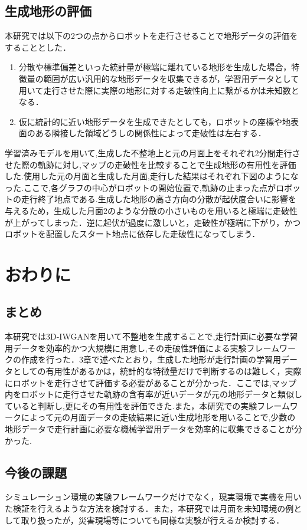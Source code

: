 \documentclass[twocolumn]{jarticle} %
\begin{document}
\subsection{生成地形の評価}
本研究では以下の2つの点からロボットを走行させることで地形データの評価をすることとした．
\begin{enumerate}
  \item 分散や標準偏差といった統計量が極端に離れている地形を生成した場合，特徴量の範囲が広い汎用的な地形データを収集できるが，学習用データとして用いて走行させた際に実際の地形に対する走破性向上に繋がるかは未知数となる．
  \item 仮に統計的に近い地形データを生成できたとしても，ロボットの座標や地表面のある隣接した領域どうしの関係性によって走破性は左右する．
\end{enumerate}
学習済みモデルを用いて,生成した不整地上と元の月面上をそれぞれ2分間走行させた際の軌跡に対し,マップの走破性を比較することで生成地形の有用性を評価した.使用した元の月面と生成した月面,走行した結果はそれぞれ下図のようになった.ここで,各グラフの中心がロボットの開始位置で,軌跡の止まった点がロボットの走行終了地点である.生成した地形の高さ方向の分散が起伏度合いに影響を与えるため，生成した月面2のような分散の小さいものを用いると極端に走破性が上がってしまった．逆に起伏が過度に激しいと，走破性が極端に下がり，かつロボットを配置したスタート地点に依存した走破性になってしまう．

\section{おわりに}

\subsection{まとめ}
本研究では3D-IWGANを用いて不整地を生成することで,走行計画に必要な学習用データを効率的かつ大規模に用意し,その走破性評価による実験フレームワークの作成を行った．3章で述べたとおり，生成した地形が走行計画の学習用データとしての有用性があるかは，統計的な特徴量だけで判断するのは難しく，実際にロボットを走行させて評価する必要があることが分かった．ここでは,マップ内をロボットに走行させた軌跡の含有率が近いデータが元の地形データと類似していると判断し,更にその有用性を評価できた.また，本研究での実験フレームワークによって元の月面データの走破結果に近い生成地形を用いることで,少数の地形データで走行計画に必要な機械学習用データを効率的に収集できることが分かった.


\subsection{今後の課題}
シミュレーション環境の実験フレームワークだけでなく，現実環境で実機を用いた検証を行えるような方法を検討する．また，本研究では月面を未知環境の例として取り扱ったが，災害現場等についても同様な実験が行えるか検討する．
\end{document}
